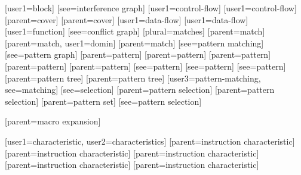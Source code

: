 
[user1={block}]
[see={interference graph}]
[user1={control-flow}]
[user1={control-flow}]
[parent={cover}]
[parent={cover}]
[user1={data-flow}]
[user1={data-flow}]
[user1={function}]
[see={conflict graph}]
[plural=matches]
[parent={match}]
[parent={match}, user1={domin}]
[parent={match}]
[see={pattern matching}]
[see={pattern graph}]
[parent={pattern}]
[parent={pattern}]
[parent={pattern}]
[parent={pattern}]
[parent={pattern}]
[see={pattern}]
[see={pattern}]
[see={pattern}]
[parent={pattern tree}]
[parent={pattern tree}]
[user3={pattern-matching}, see={matching}]
[see={selection}]
[parent={pattern selection}]
[parent={pattern selection}]
[parent={pattern set}]
[see={pattern selection}]



[parent={macro expansion}]

%
        [user1={characteristic}, user2={characteristics}]
%
        [parent={instruction characteristic}]
%
        [parent={instruction characteristic}]
%
        [parent={instruction characteristic}]
%
        [parent={instruction characteristic}]
%
        [parent={instruction characteristic}]


